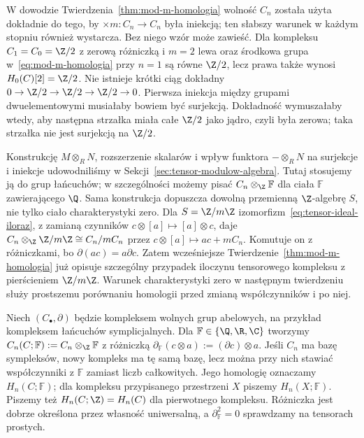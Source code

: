 \begin{uwaga}
W dowodzie Twierdzenia~\ref{thm:mod-m-homologia}
wolność $C_n$ została użyta dokładnie do tego,
by $\times m:C_n\to C_n$ była iniekcją;
ten słabszy warunek w każdym stopniu również wystarcza.
Bez niego wzór może zawieść. Dla kompleksu
$C_1=C_0=\Z/2$ z zerową różniczką i $m=2$
lewa oraz środkowa grupa w~\eqref{eq:mod-m-homologia}
przy $n=1$ są równe $\Z/2$, lecz prawa także wynosi
$H_0(C)[2]=\Z/2$. Nie istnieje krótki ciąg dokładny
$0\to\Z/2\to\Z/2\to\Z/2\to0$.
Pierwsza iniekcja między grupami dwuelementowymi musiałaby
bowiem być surjekcją. Dokładność wymuszałaby wtedy,
aby następna strzałka miała całe $\Z/2$ jako jądro,
czyli była zerowa; taka strzałka nie jest surjekcją na $\Z/2$.
\end{uwaga}

\begin{uwaga}
\label{uwaga:tensor-modulow}
Konstrukcję $M\otimes_R N$, rozszerzenie skalarów
i wpływ funktora $-\otimes_R N$ na surjekcje i iniekcje
udowodniliśmy w Sekcji~\ref{sec:tensor-modulow-algebra}.
Tutaj stosujemy ją do grup łańcuchów; w szczególności
możemy pisać $C_n\otimes_{\Z}\mathbb F$ dla ciała
$\mathbb F$ zawierającego $\Q$.
Sama konstrukcja dopuszcza dowolną przemienną $\Z$-algebrę $S$,
nie tylko ciało charakterystyki zero. Dla $S=\Z/m\Z$
izomorfizm~\eqref{eq:tensor-ideal-iloraz}, z zamianą czynników
$c\otimes[a]\mapsto[a]\otimes c$, daje
$C_n\otimes_{\Z}\Z/m\Z\cong C_n/mC_n$ przez
$c\otimes[a]\mapsto ac+mC_n$.
Komutuje on z różniczkami, bo $\partial(ac)=a\partial c$.
Zatem wcześniejsze Twierdzenie~\ref{thm:mod-m-homologia}
już opisuje szczególny przypadek iloczynu tensorowego kompleksu
z pierścieniem $\Z/m\Z$.
Warunek charakterystyki zero w następnym twierdzeniu służy
prostszemu porównaniu homologii przed zmianą współczynników i po niej.
\end{uwaga}

\begin{definicja}
\label{def:homologia-ciala-char-zero}
Niech $(C_\bullet,\partial)$ będzie kompleksem
wolnych grup abelowych, na przykład
kompleksem łańcuchów symplicjalnych.
Dla $\mathbb F\in\{\Q,\R,\C\}$ tworzymy
$C_n(C;\mathbb F):=C_n\otimes_{\Z}\mathbb F$ z różniczką
$\partial_{\mathbb F}(c\otimes a):=(\partial c)\otimes a$.
Jeśli $C_n$ ma bazę sympleksów, nowy kompleks
ma tę samą bazę, lecz można przy nich stawiać
współczynniki z $\mathbb F$ zamiast liczb całkowitych.
Jego homologię oznaczamy $H_n(C;\mathbb F)$;
dla kompleksu przypisanego przestrzeni $X$
piszemy $H_n(X;\mathbb F)$.
Piszemy też $H_n(C;\Z)=H_n(C)$ dla pierwotnego kompleksu.
Różniczka jest dobrze określona przez własność uniwersalną,
a $\partial_{\mathbb F}^2=0$ sprawdzamy na tensorach prostych.
\end{definicja}

